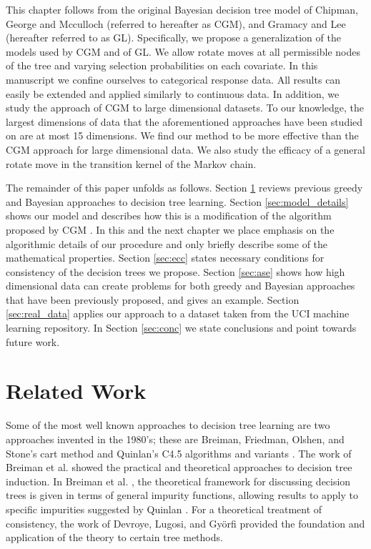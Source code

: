 This chapter follows from the original Bayesian decision tree model of Chipman, George and Mcculloch \cite{chipman1998bayesian} (referred to hereafter as CGM), and Gramacy and Lee \cite{gramacy2008bayesian}(hereafter referred to as GL). Specifically, we propose a generalization of the models used by CGM and of GL. We allow rotate moves at all permissible nodes of the tree and varying selection probabilities on each covariate. In this manuscript we confine ourselves to categorical response data. All results can easily be extended and applied similarly to continuous data. In addition, we study the approach of CGM to large dimensional datasets. To our knowledge, the largest dimensions of data that the aforementioned approaches have been studied on are at most 15 dimensions. We find our method to be more effective than the CGM approach for large dimensional data. We also study the efficacy of a general rotate move in the transition kernel of the Markov chain.

The remainder of this paper unfolds as follows. Section \ref{sec:related_work} reviews previous greedy and Bayesian approaches to decision tree learning. Section \ref{sec:model_details} shows our model and describes how this is a modification of the algorithm proposed by CGM \cite{chipman1998bayesian}. In this and the next chapter we place emphasis on the algorithmic details of our procedure and only briefly describe some of the mathematical properties. Section \ref{sec:ecc} states necessary conditions for consistency of the decision trees we propose. Section \ref{sec:ase} shows how high dimensional data can create problems for both greedy and Bayesian approaches that have been previously proposed, and gives an example. Section \ref{sec:real_data} applies our approach to a dataset taken from the UCI machine learning repository. In Section \ref{sec:conc} we state conclusions and point towards future work.

\section{Related Work}\label{sec:related_work}
Some of the most well known approaches to decision tree learning are two approaches invented in the 1980's; these are Breiman, Friedman, Olshen, and Stone's cart method \cite{breiman1984classification} and Quinlan's C4.5 algorithms and variants \cite{quinlan1993c4}.  
The work of Breiman et al. \cite{breiman1984classification} showed the practical and theoretical approaches to decision tree induction. In Breiman et al. \cite{breiman1984classification}, the theoretical framework for discussing decision trees is given in terms of general impurity functions, allowing results to apply to specific impurities suggested by Quinlan \cite{quinlan1993c4}. For a theoretical treatment of consistency, the work of Devroye, Lugosi, and Gy\"{o}rfi \cite{devroye1996probabilistic} provided the foundation and application of the theory to certain tree methods.

